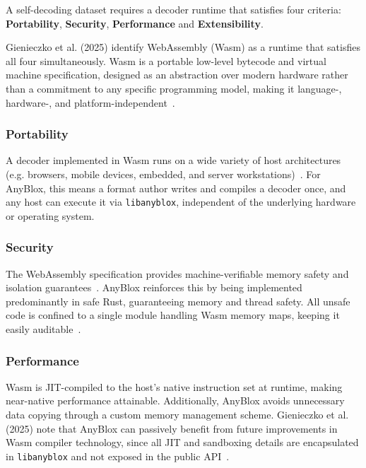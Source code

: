 A self-decoding dataset requires a decoder runtime that satisfies four criteria: \textbf{Portability}, \textbf{Security}, \textbf{Performance} and \textbf{Extensibility}.

Gienieczko et al. (2025) identify WebAssembly (Wasm) as a runtime that satisfies all four simultaneously. Wasm is a portable low-level bytecode and virtual machine specification, designed as an abstraction over modern hardware rather than a commitment to any specific programming model, making it language-, hardware-, and platform-independent~\cite{haasBringingWebSpeed2017}.

\subsubsection{Portability}

A decoder implemented in Wasm runs on a wide variety of host architectures (e.g. browsers, mobile devices, embedded, and server workstations)~\cite{gienieczkoAnyBloxFrameworkSelfDecoding2025}. For AnyBlox, this means a format author writes and compiles a decoder once, and any host can execute it via \texttt{libanyblox}, independent of the underlying hardware or operating system.

\subsubsection{Security}

The WebAssembly specification provides machine-verifiable memory safety and isolation guarantees~\cite{wattMechanisingVerifyingWebAssembly2018}. AnyBlox reinforces this by being implemented predominantly in safe Rust, guaranteeing memory and thread safety. All unsafe code is confined to a single module handling Wasm memory maps, keeping it easily auditable~\cite{gienieczkoAnyBloxFrameworkSelfDecoding2025}.

\subsubsection{Performance}

Wasm is JIT-compiled to the host's native instruction set at runtime, making near-native performance attainable. Additionally, AnyBlox avoids unnecessary data copying through a custom memory management scheme. Gienieczko et al. (2025) note that AnyBlox can passively benefit from future improvements in Wasm compiler technology, since all JIT and sandboxing details are encapsulated in \texttt{libanyblox} and not exposed in the public API~\cite{gienieczkoAnyBloxFrameworkSelfDecoding2025}.

